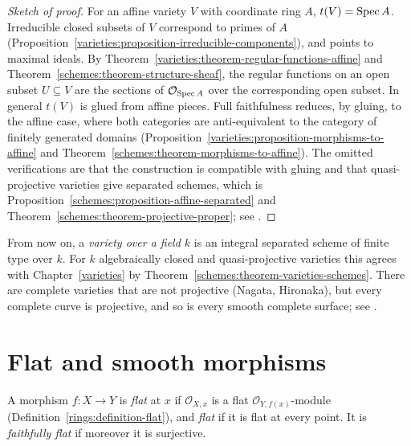 \begin{proof}[Sketch of proof]
For an affine variety $V$ with coordinate ring $A$, $t(V) = \operatorname{Spec} A$. Irreducible closed subsets of $V$ correspond to primes of $A$
(Proposition~\ref{varieties:proposition-irreducible-components}), and points to maximal ideals. By Theorem~\ref{varieties:theorem-regular-functions-affine}
and Theorem~\ref{schemes:theorem-structure-sheaf}, the regular functions on an open subset $U \subseteq V$ are the sections of $\mathcal{O}_{\operatorname{Spec} A}$ over the
corresponding open subset. In general $t(V)$ is glued from affine pieces. Full faithfulness reduces, by gluing, to the affine case, where both
categories are anti-equivalent to the category of finitely generated domains (Proposition~\ref{varieties:proposition-morphisms-to-affine} and
Theorem~\ref{schemes:theorem-morphisms-to-affine}). The omitted verifications are that the construction is compatible with gluing and that
quasi-projective varieties give separated schemes, which is Proposition~\ref{schemes:proposition-affine-separated} and
Theorem~\ref{schemes:theorem-projective-proper}; see \cite[Proposition II.2.6 and Proposition II.4.10]{hartshorne-ag}.
\end{proof}

\begin{remark}\label{schemes:remark-variety-convention}
From now on, a \emph{variety over a field $k$} is an integral separated scheme of finite type over $k$. For $k$ algebraically closed and quasi-projective
varieties this agrees with Chapter~\ref{varieties} by Theorem~\ref{schemes:theorem-varieties-schemes}. There are complete varieties that are not
projective (Nagata, Hironaka), but every complete curve is projective, and so is every smooth complete surface; see \cite[Appendix B]{hartshorne-ag}.
\end{remark}

\section{Flat and smooth morphisms}\label{schemes:section-flat-smooth}

\begin{definition}\label{schemes:definition-flat}
A morphism $f \colon X \to Y$ is \emph{flat} at $x$ if $\mathcal{O}_{X,x}$ is a flat $\mathcal{O}_{Y,f(x)}$-module (Definition~\ref{rings:definition-flat}),
and \emph{flat} if it is flat at every point. It is \emph{faithfully flat} if moreover it is surjective.
\end{definition}

